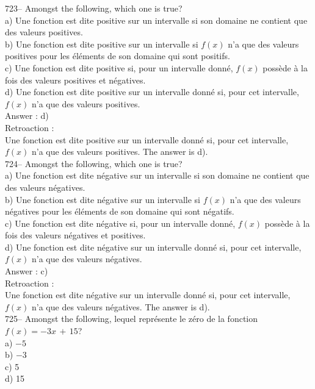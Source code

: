 ﻿\documentclass[letterpaper, 12pt]{article}
\begin{document}
723-- Amongst the following, which one is true?\\
a) Une fonction est dite positive sur un intervalle si son domaine ne
contient que des valeurs positives.\\
b) Une fonction est dite positive sur un intervalle si $f(x)$ n'a que des
valeurs positives pour les \'el\'ements de son domaine qui sont positifs.\\
c) Une fonction est dite positive si, pour un intervalle donn\'e, $f(x)$
poss\`ede \`a la fois des valeurs positives et n\'egatives.\\
d) Une fonction est dite positive sur un intervalle donn\'e si, pour cet
intervalle, $f(x)$ n'a que des valeurs positives.  \\

Answer :  d)\\

Retroaction : \\
Une fonction est dite positive sur un intervalle donn\'e si, pour cet
intervalle, $f(x)$ n'a que des valeurs positives. The answer is d).\\

724-- Amongst the following, which one is true?\\
a) Une fonction est dite n\'egative sur un intervalle si son domaine ne
contient que des valeurs n\'egatives.\\
b) Une fonction est dite n\'egative sur un intervalle si $f(x)$ n'a que des
valeurs n\'egatives pour les \'el\'ements de son domaine qui sont
n\'egatifs.\\
c) Une fonction est dite n\'egative si, pour un intervalle donn\'e, $f(x)$
poss\`ede \`a la fois des valeurs n\'egatives et positives.  \\
d) Une fonction est dite n\'egative sur un intervalle donn\'e si, pour cet
intervalle, $f(x)$ n'a que des valeurs n\'egatives.  \\

Answer : c)\\

Retroaction : \\
Une fonction est dite n\'egative sur un intervalle donn\'e si, pour cet
intervalle, $f(x)$ n'a que des valeurs n\'egatives.  The answer is d).\\

725-- Amongst the following, lequel repr\'esente le z\'ero de la
fonction $f(x)=-3x\,+\,15$?\\
a) $-5$\\
b) $-3$\\
c) 5\\
d) 15\\
\end{document}

